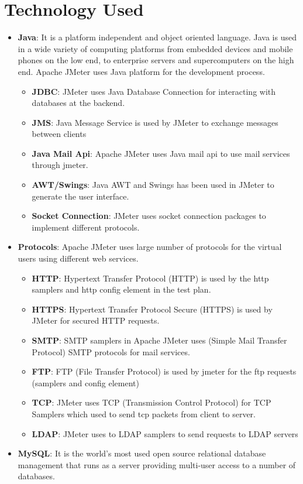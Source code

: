 \documentclass[12pt]{book}
\begin{document}
\section{Technology Used}
\begin{itemize}
 \item \textbf{Java}: It is a platform independent and object oriented language. Java is used in a wide
    variety of computing platforms from embedded devices and mobile phones on the low
    end, to enterprise servers and supercomputers on the high end. Apache JMeter uses Java
    platform for the development process.
  \begin{itemize}
   \item \textbf{JDBC}: JMeter uses Java Database Connection for interacting with databases at the backend.
   \item \textbf{JMS}: Java Message Service is used by JMeter to exchange messages between clients
   \item \textbf{Java Mail Api}: Apache JMeter uses Java mail api to use mail services through jmeter.
   \item \textbf{AWT/Swings}: Java AWT and Swings has been used in JMeter to generate the user interface.
   \item \textbf{Socket Connection}: JMeter uses socket connection packages to implement different protocols.
  \end{itemize}
 \item \textbf{Protocols}: Apache JMeter uses large number of protocols for the virtual users using different web services.
  \begin{itemize}
   \item \textbf{HTTP}: Hypertext Transfer Protocol (HTTP) is used by the http samplers and http config element in the test plan.
   \item \textbf{HTTPS}: Hypertext Transfer Protocol Secure (HTTPS) is used by JMeter for secured HTTP requests.
   \item \textbf{SMTP}: SMTP samplers in Apache JMeter uses (Simple Mail Transfer Protocol) SMTP protocols for mail services.
   \item \textbf{FTP}: FTP (File Transfer Protocol) is used by jmeter for the ftp requests (samplers and config element)
   \item \textbf{TCP}: JMeter uses TCP (Transmission Control Protocol) for TCP Samplers which used to send tcp packets from client to server.
   \item \textbf{LDAP}: JMeter uses to LDAP samplers to send requests to LDAP servers
  \end{itemize}
 \item \textbf{MySQL}: It is the world's most used open source relational database management that runs as a server providing multi-user access to a 
    number of databases.

\end{itemize}
\end{document}
